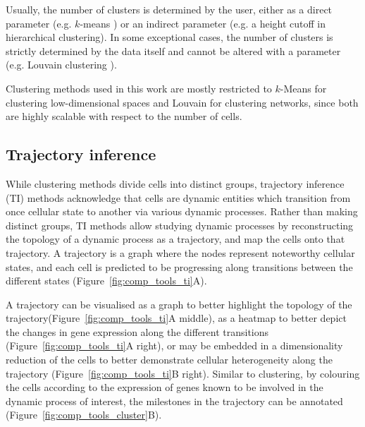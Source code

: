 Usually, the number of clusters is determined by the user, either as a direct parameter (e.g. $k$-means \cite{lloyd_leastsquaresquantization_1982}) or an indirect parameter (e.g. a height cutoff in hierarchical clustering). In some exceptional cases, the number of clusters is strictly determined by the data itself and cannot be altered with a parameter (e.g. Louvain clustering \cite{blondel_fastunfoldingcommunities_2008}).

Clustering methods used in this work are mostly restricted to $k$-Means for clustering low-dimensional spaces and Louvain for clustering networks, since both are highly scalable with respect to the number of cells.

\subsection{Trajectory inference}
While clustering methods divide cells into distinct groups, trajectory inference (TI) methods acknowledge that cells are dynamic entities which transition from once cellular state to another via various dynamic processes. Rather than making distinct groups, TI methods allow studying dynamic processes by reconstructing the topology of a dynamic process as a trajectory, and map the cells onto that trajectory. A trajectory is a graph where the nodes represent noteworthy cellular states, and each cell is predicted to be progressing along transitions between the different states (Figure~\ref{fig:comp_tools_ti}A).

A trajectory can be visualised as a graph to better highlight the topology of the trajectory(Figure~\ref{fig:comp_tools_ti}A middle), as a heatmap to better depict the changes in gene expression along the different transitions (Figure~\ref{fig:comp_tools_ti}A right), or may be embedded in a dimensionality reduction of the cells to better demonstrate cellular heterogeneity along the trajectory (Figure~\ref{fig:comp_tools_ti}B right). Similar to clustering, by colouring the cells according to the expression of genes known to be involved in the dynamic process of interest, the milestones in the trajectory can be annotated (Figure~\ref{fig:comp_tools_cluster}B). 

